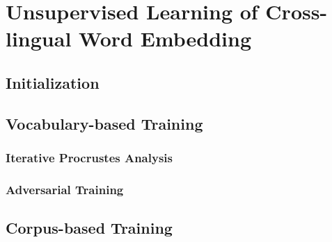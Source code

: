 \chapter{Unsupervised Learning of Cross-lingual Word Embedding}

\section{Initialization}

\section{Vocabulary-based Training}
\subsection{Iterative Procrustes Analysis}
\subsection{Adversarial Training}

\section{Corpus-based Training}